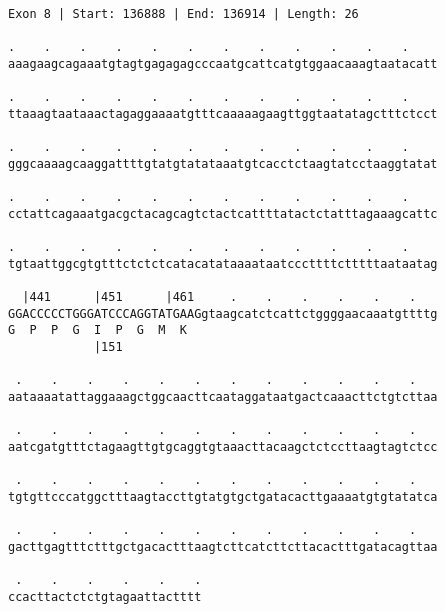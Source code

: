 \documentclass{article}
\begin{document}
\begin{Verbatim}
Exon 8 | Start: 136888 | End: 136914 | Length: 26
 
.    .    .    .    .    .    .    .    .    .    .    .    
aaagaagcagaaatgtagtgagagagcccaatgcattcatgtggaacaaagtaatacatt
  
.    .    .    .    .    .    .    .    .    .    .    .    
ttaaagtaataaactagaggaaaatgtttcaaaaagaagttggtaatatagctttctcct
  
.    .    .    .    .    .    .    .    .    .    .    .    
gggcaaaagcaaggattttgtatgtatataaatgtcacctctaagtatcctaaggtatat
  
.    .    .    .    .    .    .    .    .    .    .    .    
cctattcagaaatgacgctacagcagtctactcattttatactctatttagaaagcattc
  
.    .    .    .    .    .    .    .    .    .    .    .    
tgtaattggcgtgtttctctctcatacatataaaataatcccttttctttttaataatag
  
  |441      |451      |461     .    .    .    .    .    .   
GGACCCCCTGGGATCCCAGGTATGAAGgtaagcatctcattctggggaacaaatgttttg
G  P  P  G  I  P  G  M  K                                   
            |151                                            
  
 .    .    .    .    .    .    .    .    .    .    .    .   
aataaaatattaggaaagctggcaacttcaataggataatgactcaaacttctgtcttaa
  
 .    .    .    .    .    .    .    .    .    .    .    .   
aatcgatgtttctagaagttgtgcaggtgtaaacttacaagctctccttaagtagtctcc
  
 .    .    .    .    .    .    .    .    .    .    .    .   
tgtgttcccatggctttaagtaccttgtatgtgctgatacacttgaaaatgtgtatatca
  
 .    .    .    .    .    .    .    .    .    .    .    .   
gacttgagtttctttgctgacactttaagtcttcatcttcttacactttgatacagttaa
  
 .    .    .    .    .    .
ccacttactctctgtagaattactttt
\end{Verbatim}
\newpage
\end{document}
